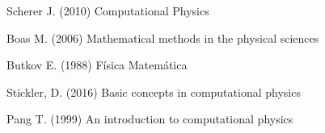 \twocolumn

\begin{thebibliography}

  \bibitem[Scherer(2010)]{} Scherer J. (2010) Computational Physics

  \bibitem[Boas(2006)]{} Boas M. (2006) Mathematical methods in the physical sciences

  \bibitem[Butkov(1988)]{} Butkov E. (1988) Física Matemática

  \bibitem[Stickler(2016)]{} Stickler, D. (2016) Basic concepts in computational physics

  \bibitem[Pang (1999)]{} Pang T. (1999) An introduction to computational physics

\end{thebibliography}